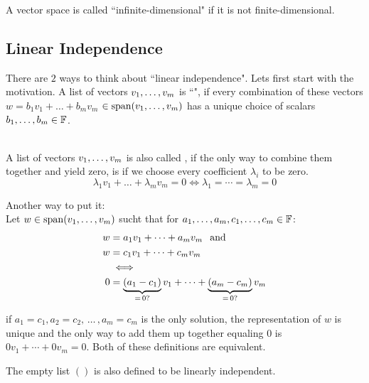 \setcounter{thm}{12}
\begin{mydef}
  A vector space is called ``infinite-dimensional" if it is not finite-dimensional.
\end{mydef}

\pagebreak

\subsection{Linear Independence}

\setcounter{thm}{14}
\begin{mydef} 
  There are $2$ ways to think about ``linear independence". Lets first start with the motivation. A list of vectors $v_1, \dots, v_m$ is ``\lid", if every combination of these vectors $w = b_1v_1 + \dots+ b_mv_m$ $\in \operatorname{span} (v_1, \dots, v_m)$ has a unique choice of scalars $b_1, \dots, b_m \in \mathbb{F}$.

   \\
  A list of vectors $v_1, \dots, v_m$ is also called \lid, if the only way to combine them together and yield zero, is if we choose every coefficient $\lambda_i$ to be zero.
  \begin{equation}
    \lambda_1v_1 + \dots + \lambda_mv_m = 0 \iff \lambda_1 = \cdots = \lambda_m = 0
  \end{equation}

  Another way to put it:\\
  Let $w\in \operatorname{span} (v_1, \dots, v_m)$ sucht that for $a_1, \dots, a_m, c_1, \dots, c_m \in \mathbb{F}$:
  \begin{equation}
    \begin{aligned}
      w & =a_1 v_1 + \cdots + a_m v_m \;\;\, \text{and}\;\; \\
      w & =c_1 v_1 + \cdots + c_m v_m \\
      & \iff \\
      0 & = \underbrace{(a_1 - c_1)}_{= \, 0\text{?}} v_1 + \cdots + \underbrace{(a_m -c_m)}_{= \, 0\text{?}} v_m
    \end{aligned}
  \end{equation}

  if $a_1 = c_1, a_2 = c_2, \, \dots \, , a_m = c_m$ is the only solution, the representation of $w$ is unique and the only way to add them up together equaling $0$ is $0v_1+\cdots+0v_m=0$. Both of these definitions are equivalent.

  The empty list $()$ is also defined to be linearly independent.
\end{mydef}




